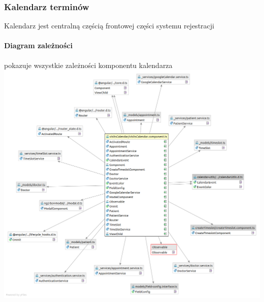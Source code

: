 \documentclass[polish,12pt]{aghthesis}
\begin{document}
\subsubsection{Kalendarz terminów}
Kalendarz jest centralną częścią frontowej części systemu rejestracji
\paragraph{Diagram zależności} pokazuje wszystkie zależności komponentu kalendarza
\includegraphics[width=\textwidth]{visitsCalendar_dep}
\end{document}
